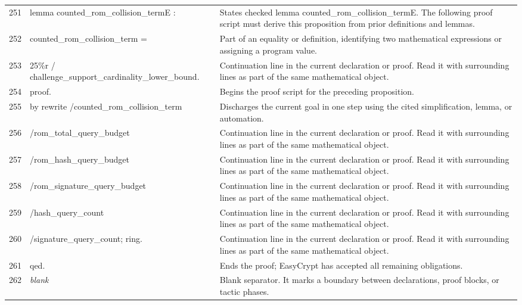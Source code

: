 \documentclass[10pt]{article}
\begin{document}
\begin{longtable}{r L{0.53\textwidth} L{0.37\textwidth}}
251 & {\ttfamily\scriptsize lemma counted\_rom\_collision\_termE :} & States checked lemma counted\_rom\_collision\_termE.  The following proof script must derive this proposition from prior definitions and lemmas. \\
252 & {\ttfamily\scriptsize   counted\_rom\_collision\_term =} & Part of an equality or definition, identifying two mathematical expressions or assigning a program value. \\
253 & {\ttfamily\scriptsize     25\%r / challenge\_support\_cardinality\_lower\_bound.} & Continuation line in the current declaration or proof.  Read it with surrounding lines as part of the same mathematical object. \\
254 & {\ttfamily\scriptsize proof.} & Begins the proof script for the preceding proposition. \\
255 & {\ttfamily\scriptsize by rewrite /counted\_rom\_collision\_term} & Discharges the current goal in one step using the cited simplification, lemma, or automation. \\
256 & {\ttfamily\scriptsize            /rom\_total\_query\_budget} & Continuation line in the current declaration or proof.  Read it with surrounding lines as part of the same mathematical object. \\
257 & {\ttfamily\scriptsize            /rom\_hash\_query\_budget} & Continuation line in the current declaration or proof.  Read it with surrounding lines as part of the same mathematical object. \\
258 & {\ttfamily\scriptsize            /rom\_signature\_query\_budget} & Continuation line in the current declaration or proof.  Read it with surrounding lines as part of the same mathematical object. \\
259 & {\ttfamily\scriptsize            /hash\_query\_count} & Continuation line in the current declaration or proof.  Read it with surrounding lines as part of the same mathematical object. \\
260 & {\ttfamily\scriptsize            /signature\_query\_count; ring.} & Continuation line in the current declaration or proof.  Read it with surrounding lines as part of the same mathematical object. \\
261 & {\ttfamily\scriptsize qed.} & Ends the proof; EasyCrypt has accepted all remaining obligations. \\
262 & {\ttfamily\scriptsize \emph{blank}} & Blank separator.  It marks a boundary between declarations, proof blocks, or tactic phases. \\

\end{longtable}
\end{document}
